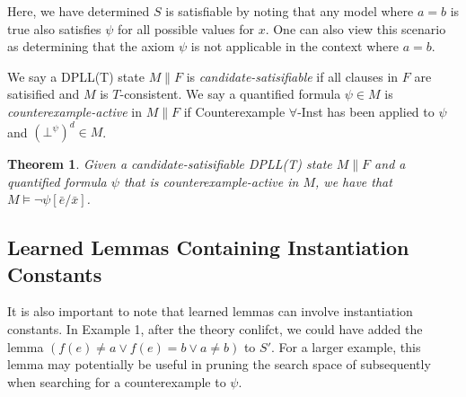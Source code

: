\documentclass{llncs}
\newtheorem{thm}{Theorem}
\begin{document}
Here, we have determined $S$ is satisfiable by noting that any model where $a = b$ is true also satisfies $\psi$ for all possible values for $x$.
One can also view this scenario as determining that the axiom $\psi$ is not applicable in the context where $a = b$.

We say a DPLL(T) state $M \parallel F$ is \emph{candidate-satisifiable} if all clauses in $F$ are satisified and $M$ is $T$-consistent.
We say a quantified formula $\psi \in M$ is \emph{counterexample-active} in $M \parallel F$ if Counterexample $\forall$-Inst has been applied to $\psi$ and $(\bot^\psi)^d \in M$.

\begin{thm}
\label{thm:cerep}
Given a candidate-satisifiable DPLL(T) state $M \parallel F$ and a quantified formula $\psi$ that is counterexample-active in $M$, we have that $M \models \neg \psi[\bar{e}/\bar{x}]$.
\end{thm}

\subsection{Learned Lemmas Containing Instantiation Constants}

It is also important to note that learned lemmas can involve instantiation constants.
In Example 1, after the theory conlifct, we could have added the lemma $( f( e ) \neq a \vee f( e ) = b \vee a \neq b )$ to $S'$.
For a larger example, this lemma may potentially be useful in pruning the search space of subsequently when searching for a counterexample to $\psi$.

\begin{comment}
It is also important to note that learned lemmas can involve instantiation constants.
In this example, after the theory conlifct, we could have added the lemma $(\varphi_1 : ) ( f( e ) \neq a \vee f( e ) = b \vee a \neq b )$ to $S'$.
In this case, we may apply Decide to come to the state $( a = b ), \psi, (\neg \bot^\psi), (f( e ) \neq a)^d \parallel S' \cup \varphi$, where again all clauses are satisfied, and the solver answers SAT in the same manner.

However, note that the lemma $\varphi_1$ is only useful in contexts in which $\psi$ is asserted.
In other words, the solver should not be searching for values of counterexamples to quantified formulas $\psi$ when $\psi$ is not asserted.
We will see in Section~\ref{sec:implementation} a recommended implementation for which this concern is addressed.
[do this: do these lemmas pollute the DPLL(T) space?  When should we forget them?  Should we give them to minisat?]
[do this: examine elaborating lemmas involving instantiation constants as being lemmas involving universal statements, justify as well]
\end{comment}
\end{document}
